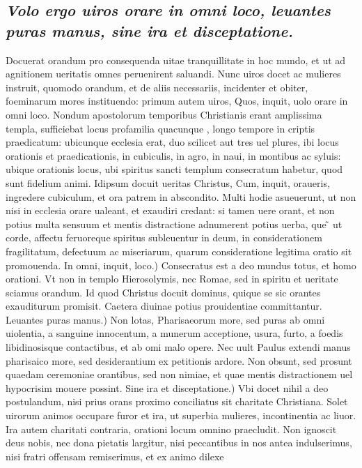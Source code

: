 \documentclass{article}
\begin{document}
\begin{pages}
\subsection*{\textit{Volo ergo uiros orare in omni loco, leuantes puras manus, sine ira et disceptatione. }}\pstart Docuerat orandum pro consequenda uitae tranquillitate in hoc mundo, et ut ad agnitionem ueritatis omnes peruenirent saluandi. Nunc uiros docet ac mulieres instruit, quomodo orandum, et de aliis necessariis, incidenter et obiter, foeminarum mores instituendo: primum autem uiros, Quos, inquit, uolo orare in omni loco. Nondum apostolorum temporibus Christianis erant amplissima templa, sufficiebat locus profamilia quacunque , longo tempore in criptis praedicatum: ubicunque  ecclesia erat, duo scilicet aut tres uel plures, ibi locus orationis et praedicationis, in cubiculis, in agro, in naui, in montibus ac syluis: ubique orationis locus, ubi spiritus sancti templum consecratum habetur, quod sunt fidelium animi. Idipsum docuit ueritas Christus, Cum, inquit, oraueris, ingredere cubiculum, et ora patrem in abscondito. Multi hodie asueuerunt, ut non nisi in ecclesia orare ualeant, et exaudiri credant: si tamen uere orant, et non potius multa sensuum et mentis distractione adnumerent potius uerba, que ̃ ut corde, affectu feruoreque spiritus subleuentur in deum, in considerationem fragilitatum, defectuum ac miseriarum, quarum consideratione legitima oratio sit promouenda. In omni, inquit, loco.) Consecratus est a deo mundus totus, et homo orationi. Vt non in templo Hierosolymis, nec Romae, sed in spiritu et ueritate sciamus orandum. Id quod Christus docuit dominus, quique se sic orantes exauditurum promisit. Caetera diuinae potius prouidentiae committantur. Leuantes puras manus.) Non lotas, Pharisaeorum more, sed puras ab omni uiolentia, a sanguine innocentum, a munerum acceptione, usura, furto, a foedis libidinosisque contactibus, et ab omi malo opere. Nec uult Paulus extendi manus pharisaico more, sed desiderantium ex petitionis ardore. Non obsunt, sed prosunt quaedam ceremoniae orantibus, sed non nimiae, et quae mentis distractionem uel hypocrisim mouere possint. Sine ira et disceptatione.) Vbi docet nihil a deo postulandum, nisi prius orans proximo conciliatus sit charitate Christiana. Solet uirorum animos occupare furor et ira, ut superbia mulieres, incontinentia ac liuor. Ira autem charitati contraria, orationi locum omnino praecludit. Non ignoscit deus nobis, nec dona pietatis largitur, nisi peccantibus in nos antea indulserimus, nisi fratri offensam remiserimus, et ex animo dilexe\pend

\end{pages}
\end{document}
